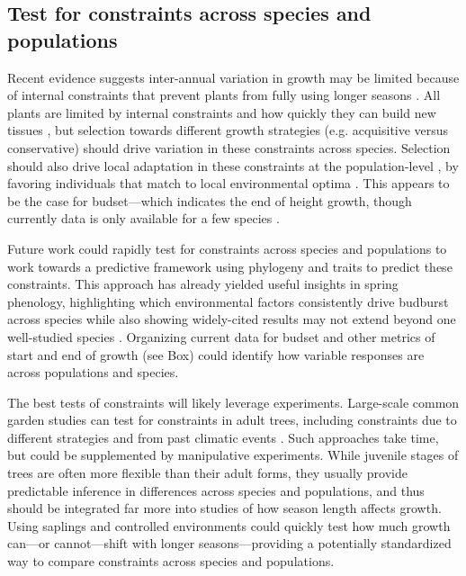 \documentclass[11pt]{article}
\begin{document}
\subsection*{Test for constraints across species and populations} %

Recent evidence suggests inter-annual variation in growth may be limited because of internal constraints that prevent plants from fully using longer seasons \citep{zohner2023effect}. All plants are limited by internal constraints and how quickly they can build new tissues \citep{marchand2021timing,luo2024internal}, but selection towards different growth strategies (e.g. acquisitive versus conservative) should drive variation in these constraints across species. Selection should also drive local adaptation in these constraints at the population-level \citep{mckown2016impacts,soolanayakanahally2013timing}, by favoring individuals that match to local environmental optima \citep{Colautti:2010,mckown2014np}. This appears to be the case for budset---which indicates the end of height growth, though currently data is only available for a few species \citep{aitken2016,zeng2024weak}. 

Future work could rapidly test for constraints across species and populations to work towards a predictive framework using phylogeny and traits to predict these constraints. This approach has already yielded useful insights in spring phenology, highlighting which environmental factors consistently drive budburst across species while also showing widely-cited results may not extend beyond one well-studied species \citep{morales2024phylogenetic}. Organizing current data for budset and other metrics of start and end of growth (see Box) could identify how variable responses are across populations and species. 

The best tests of constraints will likely leverage experiments. Large-scale common garden studies can test for constraints in adult trees, including constraints due to different strategies and from past climatic events \citep[e.g., by selecting species with different growth strategies and/or selecting populations within a species with varying past exposure to damaging early season frosts][]{charrier2015effects,tixier2020comparison}. Such approaches take time, but could be supplemented by manipulative experiments. While juvenile stages of trees are often more flexible than their adult forms, they usually provide predictable inference in differences across species and populations, and thus should be integrated far more into studies of how season length affects growth. Using saplings and controlled environments could quickly test how much growth can---or cannot---shift with longer seasons---providing a potentially standardized way to compare constraints across species and populations. 
\end{document}
